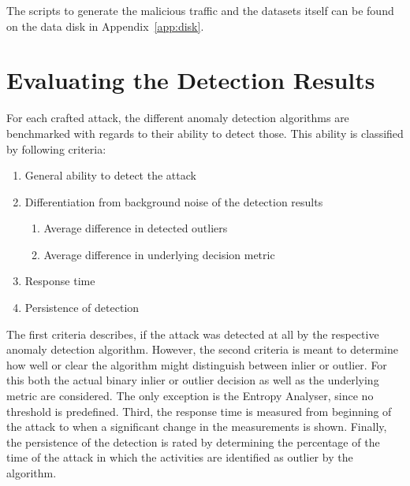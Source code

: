 The scripts to generate the malicious traffic and the datasets itself can be found on the data disk in Appendix~\ref{app:disk}.

\section{Evaluating the Detection Results}
\label{sec:methods:eval}

For each crafted attack, the different anomaly detection algorithms are benchmarked with regards to their ability to detect those.
This ability is classified by following criteria:

\begin{enumerate}
	\item General ability to detect the attack
	\item Differentiation from background noise of the detection results
		\begin{enumerate}
			\item Average difference in detected outliers
			\item Average difference in underlying decision metric
		\end{enumerate}
	\item Response time 
	\item Persistence of detection
\end{enumerate}

The first criteria describes, if the attack was detected at all by the respective anomaly detection algorithm.
However, the second criteria is meant to determine how well or clear the algorithm might distinguish between inlier or outlier. For this both the actual binary inlier or outlier decision as well as the underlying metric are considered. The only exception is the Entropy Analyser, since no threshold is predefined.
Third, the response time is measured from beginning of the attack to when a significant change in the measurements is shown.
Finally, the persistence of the detection is rated by determining the percentage of the time of the attack in which the activities are identified as outlier by the algorithm.

\begin{comment}
Angriffe:

DoS
	Kurzschluss im Bus -> DoS auf gesamtem Segment
	A_Restart-Pakete -> DoS gegen einzelne Teilnehmer
Replay-Angriffe
	Zeit mitschneiden -> wiedergeben
	Tag mitschneiden, komprimiert wiedergeben
Manipulation von Paketen (Payload tauschen)
Konfiguration manipulieren
Überwindung von Linienkopplern
Address-Spoofing
	falsche Adresse in Liniensegment
	mit existierender Adresse senden
Netzanalyse mit knxMap (https://github.com/takeshixx/knxmap)
Mitlesen und sofort gegenteilige Aktion auslösen
High-Level-Angriffe:
	nur best. Aktionen zulassen
	Provokation/Sabotage von menschl. Verhalten
Social-Engineering -> Einschleusen von Geräten
\end{comment}